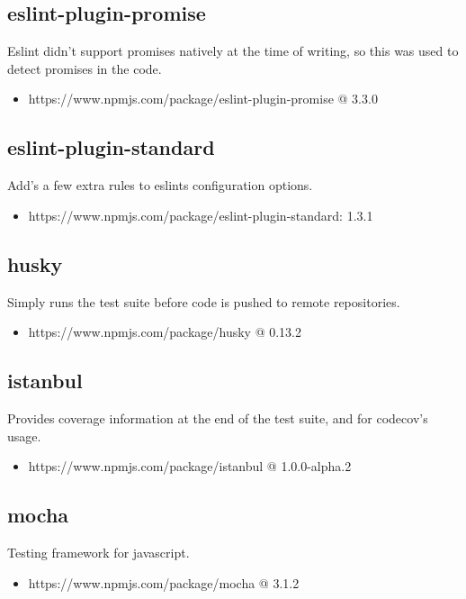   \subsection{eslint-plugin-promise}
  Eslint didn't support promises natively at the time of writing, so this was used to detect promises in the code.
  \begin{itemize}
    \item https://www.npmjs.com/package/eslint-plugin-promise @ 3.3.0
  \end{itemize}

  \subsection{eslint-plugin-standard}
  Add's a few extra rules to eslints configuration options.
  \begin{itemize}
    \item https://www.npmjs.com/package/eslint-plugin-standard: 1.3.1
  \end{itemize}

  \subsection{husky}
  Simply runs the test suite before code is pushed to remote repositories.
  \begin{itemize}
    \item https://www.npmjs.com/package/husky @ 0.13.2
  \end{itemize}

  \subsection{istanbul}
  Provides coverage information at the end of the test suite, and for codecov's usage.
  \begin{itemize}
    \item https://www.npmjs.com/package/istanbul @ 1.0.0-alpha.2
  \end{itemize}

  \subsection{mocha}
  Testing framework for javascript.
  \begin{itemize}
    \item https://www.npmjs.com/package/mocha @ 3.1.2
  \end{itemize}

